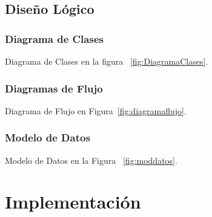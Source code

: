 \documentclass[12pt]{article}
\begin{document}
\subsection{Dise\~no Lógico}
\subsubsection{Diagrama de Clases}
Diagrama de Clases en la figura ~\ref{fig:DiagramaClases}.

\subsubsection{Diagramas de Flujo}
Diagrama de Flujo en Figura~\ref{fig:diagramaflujo}.

\subsubsection{Modelo de Datos}
Modelo de Datos en la Figura ~\ref{fig:moddatos}.



\newpage
\section{Implementación}
\end{document}
